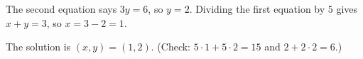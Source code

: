 The second equation says $3y=6$, so $y=2$. Dividing the first equation by $5$ gives $x+y=3$, so $x=3-2=1$.

The solution is $\boxed{(x,y)=(1,2)}$. (Check: $5\cdot1+5\cdot2=15$ and $2+2\cdot2=6$.)
